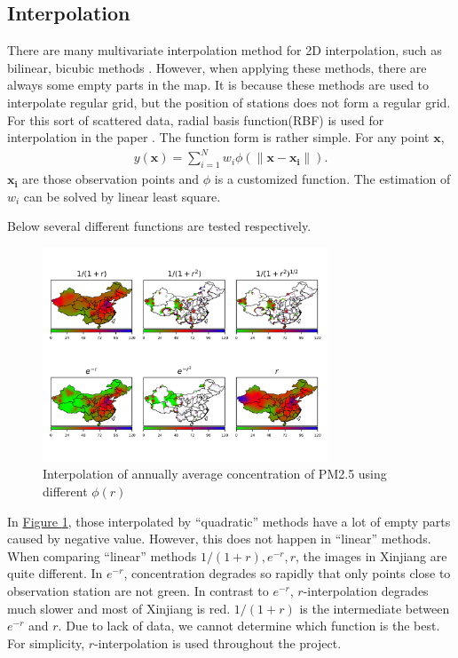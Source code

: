 \documentclass[letterpaper]{article}
\begin{document}
\begin{CJK*}{UTF8}{gkai}
\section{Interpolation}

There are many multivariate interpolation method for 2D interpolation, such as bilinear, bicubic methods . However, when applying these methods, there are always some empty parts in the map. It is because these methods are used to interpolate regular grid, but the position of stations does not form a regular grid. For this sort of scattered data, radial basis function(RBF) is used for interpolation in the paper . The function form is rather simple. For any point $\mathbf{x}$,
\begin{eqnarray}
  y(\mathbf{x}) = \sum_{i=1}^Nw_i\phi\left(\|\mathbf{x} - \mathbf{x_i}\|\right).
\end{eqnarray}
$\mathbf{x_i}$ are those observation points and $\phi$ is a customized function. The estimation of $w_i$ can be solved by linear least square.

Below several different functions are tested respectively.

\begin{figure}[h]
  \includegraphics[width = 8.5cm]{Interpolation_from_20150102_to_20151231.png}
  \caption{Interpolation of annually average concentration of PM2.5 using different
    $\phi(r)$}
  \label{figure:0}
  \centering
\end{figure}

In \hyperref[figure:0]{Figure \ref*{figure:0}}, those interpolated by ``quadratic'' methods have a lot of empty parts caused by negative value. However, this does not happen in ``linear'' methods. When comparing ``linear'' methods $1/(1+r), e^{-r}, r$, the images in Xinjiang are quite different. In $e^{-r}$, concentration degrades so rapidly that only points close to observation station are not green. In contrast to $e^{-r}$, $r$-interpolation degrades much slower and most of Xinjiang is red. $1/(1+r)$ is the intermediate between $e^{-r}$ and $r$. Due to lack of data, we cannot determine which function is the best. For simplicity, $r$-interpolation is used throughout the project.


\end{CJK*}
\end{document}
